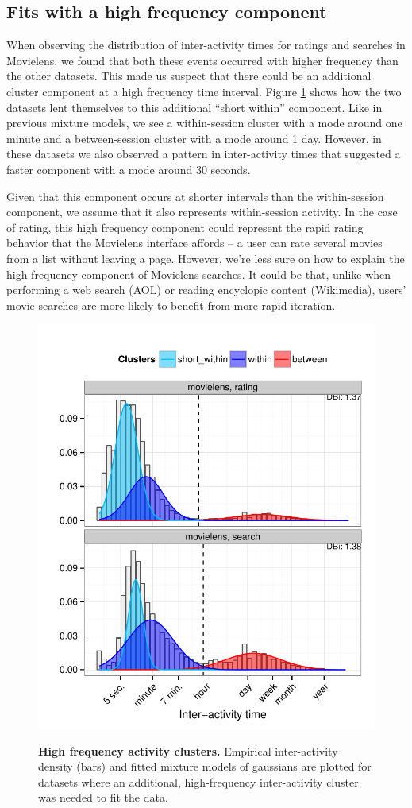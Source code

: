 \subsection{Fits with a high frequency component}
When observing the distribution of inter-activity times for ratings and searches in Movielens, we found that both these events occurred with higher frequency than the other datasets.  This made us suspect that there could be an additional cluster component at a high frequency time interval.  Figure \ref{fig:operation_mixed_clusters} shows how the two datasets lent themselves to this additional ``short within'' component.  Like in previous mixture models, we see a within-session cluster with a mode around one minute and a between-session cluster with a mode around 1 day.  However, in these datasets we also observed a pattern in inter-activity times that suggested a faster component with a mode around 30 seconds.

Given that this component occurs at shorter intervals than the within-session component, we assume that it also represents within-session activity.  In the case of rating, this high frequency component could represent the rapid rating behavior that the Movielens interface affords -- a user can rate several movies from a list without leaving a page.  However, we're less sure on how to explain the high frequency component of Movielens searches.  It could be that, unlike when performing a web search (AOL) or reading encyclopic content (Wikimedia), users' movie searches are more likely to benefit from more rapid iteration.
\begin{figure}
\centering
\includegraphics[width=.45\textwidth]{figures/operation_mixed_clusters.pdf}
\label{fig:operation_mixed_clusters}
\caption{
    \textbf{High frequency activity clusters.} Empirical inter-activity density (bars) and fitted mixture models of gaussians are plotted for datasets where an additional, high-frequency inter-activity cluster was needed to fit the data.
}
\end{figure}

